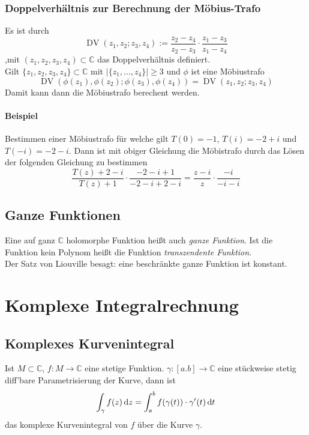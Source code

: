 \subsubsection{Doppelverhältnis zur Berechnung der Möbius-Trafo}
Es ist durch
\begin{equation*}
    \operatorname{DV}(z_1,z_2;z_3,z_4):=\frac{z_2-z_4}{z_2-z_3}\cdot\frac{z_1-z_3}{z_1-z_4}
\end{equation*}
,mit $(z_1,z_2,z_3,z_4)\subset\mathbb{C}$ das Doppelverhältnis definiert.\\
Gilt $\{z_1,z_2,z_3,z_4\}\subset\mathbb{C}$ mit $|\{z_1,\dots,z_4\}|\geq 3$ und $\phi$ ist eine Möbiustrafo
\begin{equation*}
    \operatorname{DV}(\phi(z_1),\phi(z_2);\phi(z_3),\phi(z_4))=\operatorname{DV}(z_1,z_2;z_3,z_4)
\end{equation*}
Damit kann dann die Möbiustrafo berechent werden.
\paragraph{Beispiel}
Bestimmen einer Möbiustrafo für welche gilt $T(0)=-1$, $T(i)=-2+i$ und $T(-i)=-2-i$. Dann ist mit obiger Gleichung die Möbistrafo durch das Lösen der folgenden Gleichung zu bestimmen
\begin{equation*}
    \frac{T(z)+2-i}{T(z)+1}\cdot\frac{-2-i+1}{-2-i+2-i}=\frac{z-i}{z}\cdot\frac{-i}{-i-i}
\end{equation*}

\subsection{Ganze Funktionen}
Eine auf ganz $\mathbb{C}$ holomorphe Funktion heißt auch \textit{ganze Funktion}. Ist die Funktion kein Polynom heißt die Funktion \textit{transzendente Funktion}.\\
Der Satz von Liouville besagt: eine beschränkte ganze Funktion ist konstant.


\section{Komplexe Integralrechnung}

\subsection{Komplexes Kurvenintegral}
Ist $M\subset\mathbb{C}$, $f:M\to\mathbb{C}$ eine stetige Funktion. $\gamma:[a.b]\to\mathbb{C}$ eine stückweise stetig diff'bare Parametrisierung der Kurve, dann ist
\begin{equation*}
    \int_{\gamma}f(z)\mathop{}\!\mathrm{d} z = \int_a^b f(\gamma(t))\cdot \gamma'(t)\mathop{}\!\mathrm{d} t
\end{equation*}
das komplexe Kurvenintegral von $f$ über die Kurve $\gamma$.

